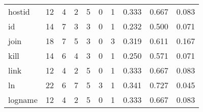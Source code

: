 \begin{longtable}{lp{2.0cm}p{2.0cm}p{2.0cm}p{2.0cm}p{2.0cm}p{2.0cm}p{2.0cm}p{2.0cm}p{2.0cm}}
hostid    &                     12 &                                             4 &                                            2 &                                           5 &                                            0 &                                          1 &                                0.333 &                                  0.667 &                                0.083 \\
id        &                     14 &                                             7 &                                            3 &                                           3 &                                            0 &                                          1 &                                0.232 &                                  0.500 &                                0.071 \\
join      &                     18 &                                             7 &                                            5 &                                           3 &                                            0 &                                          3 &                                0.319 &                                  0.611 &                                0.167 \\
kill      &                     14 &                                             6 &                                            4 &                                           3 &                                            0 &                                          1 &                                0.250 &                                  0.571 &                                0.071 \\
link      &                     12 &                                             4 &                                            2 &                                           5 &                                            0 &                                          1 &                                0.333 &                                  0.667 &                                0.083 \\
ln        &                     22 &                                             6 &                                            7 &                                           5 &                                            3 &                                          1 &                                0.341 &                                  0.727 &                                0.045 \\
logname   &                     12 &                                             4 &                                            2 &                                           5 &                                            0 &                                          1 &                                0.333 &                                  0.667 &                                0.083 \\

\end{longtable}
